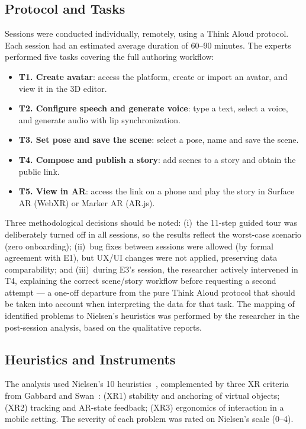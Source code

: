 \documentclass[conference]{IEEEtran}
\begin{document}
\subsection{Protocol and Tasks}

Sessions were conducted individually, remotely, using a Think Aloud protocol.
Each session had an estimated average duration of 60--90 minutes. The experts
performed five tasks covering the full authoring workflow:

\begin{itemize}
  \item \textbf{T1. Create avatar}: access the platform, create or import an
    avatar, and view it in the 3D editor.
  \item \textbf{T2. Configure speech and generate voice}: type a text,
    select a voice, and generate audio with lip synchronization.
  \item \textbf{T3. Set pose and save the scene}: select a pose, name and
    save the scene.
  \item \textbf{T4. Compose and publish a story}: add scenes to a story and
    obtain the public link.
  \item \textbf{T5. View in AR}: access the link on a phone and play the
    story in Surface AR (WebXR) or Marker AR (AR.js).
\end{itemize}

Three methodological decisions should be noted: (i)~the 11-step guided tour
was deliberately turned off in all sessions, so the results reflect the
worst-case scenario (zero onboarding); (ii)~bug fixes between sessions were
allowed (by formal agreement with E1), but UX/UI changes were not applied,
preserving data comparability; and (iii)~during E3's session, the researcher
actively intervened in T4, explaining the correct scene/story workflow before
requesting a second attempt --- a one-off departure from the pure Think Aloud
protocol that should be taken into account when interpreting the data for
that task. The mapping of identified problems to Nielsen's heuristics was
performed by the researcher in the post-session analysis, based on the
qualitative reports.

\subsection{Heuristics and Instruments}

The analysis used Nielsen's 10 heuristics~\cite{nielsen1994}, complemented by
three XR criteria from Gabbard and Swan~\cite{gabbard2008}: (XR1) stability
and anchoring of virtual objects; (XR2) tracking and AR-state feedback; (XR3)
ergonomics of interaction in a mobile setting. The severity of each problem
was rated on Nielsen's scale (0--4).
\end{document}

